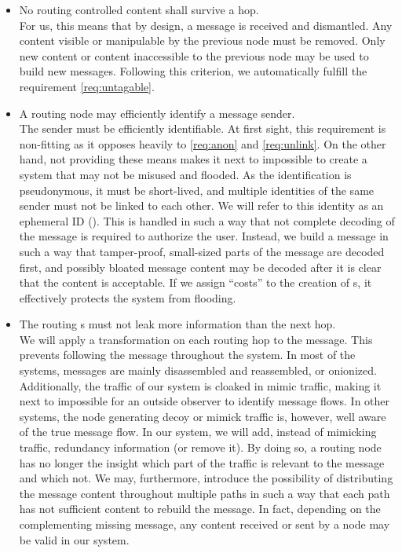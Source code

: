 \begin{itemize}
	\item No routing controlled content shall survive a hop.\\
	For us, this means that by design, a message is received and dismantled. Any content visible or manipulable by the previous node must be removed. Only new content or content inaccessible to the previous node may be used to build new messages. Following this criterion, we automatically fulfill the requirement \ref{req:untagable}.
	\item A routing node may efficiently identify a message sender.\\      
	The sender must be efficiently identifiable. At first sight, this requirement is non-fitting as it opposes heavily to \ref{req:anon} and \ref{req:unlink}. On the other hand, not providing these means makes it next to impossible to create a system that may not be misused and flooded. As the identification is pseudonymous, it must be short-lived, and multiple identities of the same sender must not be linked to each other. We will refer to this identity as an ephemeral ID (). This  is handled in such a way that not complete decoding of the message is required to authorize the user. Instead, we build a message in such a way that tamper-proof, small-sized parts of the message are decoded first, and possibly bloated message content may be decoded after it is clear that the content is acceptable. If we assign ``costs'' to the creation of s, it effectively protects the system from flooding.
	\item The routing s must not leak more information than the next hop.\\
	We will apply a transformation on each routing hop to the message. This prevents following the message throughout the system. In most of the systems, messages are mainly disassembled and reassembled, or onionized. Additionally, the traffic of our system is cloaked in mimic traffic, making it next to impossible for an outside observer to identify message flows. In other systems, the node generating decoy or mimick traffic is, however, well aware of the true message flow. In our system, we will add, instead of mimicking traffic, redundancy information (or remove it). By doing so, a routing node has no longer the insight which part of the traffic is relevant to the message and which not. We may, furthermore, introduce the possibility of distributing the message content throughout multiple paths in such a way that each path has not sufficient content to rebuild the message. In fact, depending on the complementing missing message, any content received or sent by a node may be valid in our system. 

\end{itemize}
